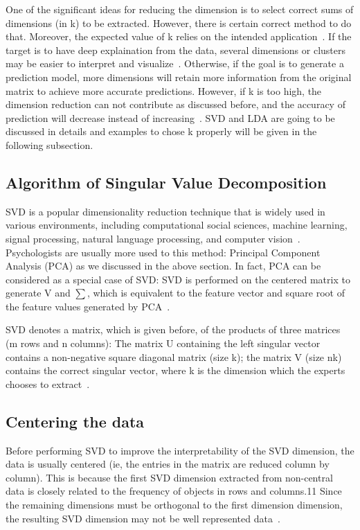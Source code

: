 One of the significant ideas for reducing the dimension is 
to select correct sums of dimensions (in k) to be
 extracted. However, there is certain correct method to do that. 
Moreover, the expected value of k relies on the intended 
application~\cite{hid515-12}. 
If the target is to have deep explaination from the data, several
 dimensions or clusters may be easier to interpret and 
visualize~\cite{hid515-12}. 
Otherwise, if the goal is to generate a prediction model, more
 dimensions will retain more information from the 
original matrix to achieve more accurate 
predictions. However, if k is too high, 
the dimension reduction can not contribute as discussed before, 
and the accuracy of prediction will decrease instead of 
increasing~\cite{hid515-12}. 
SVD and LDA 
are going to be discussed in details and examples to chose k 
properly will be given in the following subsection.

\subsection{Algorithm of Singular Value Decomposition~\cite{hid515-12}}

SVD is a popular dimensionality reduction technique that is widely
 used in various environments, including computational social 
sciences, machine learning, signal processing, natural language 
processing, and computer vision~\cite{hid515-12}. 
Psychologists are usually more
 used to this method: Principal Component Analysis (PCA) as we 
discussed in the above section.
 In fact, PCA can be considered as a special case of SVD: SVD is 
performed on the centered matrix to generate V and $\sum$, 
which is equivalent
 to the feature vector and square root of the feature values 
generated by PCA~\cite{hid515-12}. 

SVD denotes a matrix, which is given before, of the products of 
three matrices 
(m rows
 and n columns): The matrix U containing the left 
singular vector contains a non-negative square diagonal matrix 
(size k); the matrix V (size nk) contains the correct singular 
vector, where k is the dimension which the experts chooses to 
extract~\cite{hid515-12}. 

\subsection{Centering the data~\cite{hid515-12}}

Before performing SVD to improve the interpretability of the SVD 
dimension, the data is usually centered (ie, the entries in the 
matrix are reduced column by column). This is because the first SVD
 dimension extracted from non-central data is closely related to 
the frequency of objects in rows and columns.11 Since the remaining
 dimensions must be orthogonal to the first dimension dimension, 
the resulting SVD dimension may not be well represented 
data~\cite{hid515-12}.

